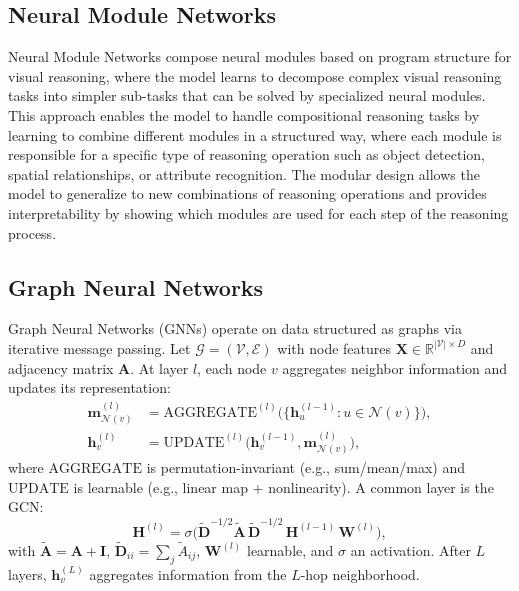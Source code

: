 \subsection{Neural Module Networks}

Neural Module Networks compose neural modules based on program structure for visual reasoning, where the model learns to decompose complex visual reasoning tasks into simpler sub-tasks that can be solved by specialized neural modules. This approach enables the model to handle compositional reasoning tasks by learning to combine different modules in a structured way, where each module is responsible for a specific type of reasoning operation such as object detection, spatial relationships, or attribute recognition. The modular design allows the model to generalize to new combinations of reasoning operations and provides interpretability by showing which modules are used for each step of the reasoning process.

\subsection{Graph Neural Networks}

Graph Neural Networks (GNNs) operate on data structured as graphs via iterative message passing. Let $\mathcal{G}=(\mathcal{V},\mathcal{E})$ with node features $\mathbf{X} \in \mathbb{R}^{|\mathcal{V}| \times D}$ and adjacency matrix $\mathbf{A}$. At layer $l$, each node $v$ aggregates neighbor information and updates its representation:
\begin{align}
\mathbf{m}_{\mathcal{N}(v)}^{(l)} &= \mathrm{AGGREGATE}^{(l)}\big(\{\mathbf{h}_u^{(l-1)}: u \in \mathcal{N}(v)\}\big), \\
\mathbf{h}_v^{(l)} &= \mathrm{UPDATE}^{(l)}\big(\mathbf{h}_v^{(l-1)}, \mathbf{m}_{\mathcal{N}(v)}^{(l)}\big),
\end{align}
where $\mathrm{AGGREGATE}$ is permutation-invariant (e.g., sum/mean/max) and $\mathrm{UPDATE}$ is learnable (e.g., linear map + nonlinearity). A common layer is the GCN:
\begin{equation}
\mathbf{H}^{(l)} = \sigma\!\big( \tilde{\mathbf{D}}^{-1/2} \tilde{\mathbf{A}} \, \tilde{\mathbf{D}}^{-1/2} \, \mathbf{H}^{(l-1)} \, \mathbf{W}^{(l)} \big),
\end{equation}
with $\tilde{\mathbf{A}}=\mathbf{A}+\mathbf{I}$, $\tilde{\mathbf{D}}_{ii}=\sum_j \tilde{A}_{ij}$, $\mathbf{W}^{(l)}$ learnable, and $\sigma$ an activation. After $L$ layers, $\mathbf{h}_v^{(L)}$ aggregates information from the $L$-hop neighborhood.

